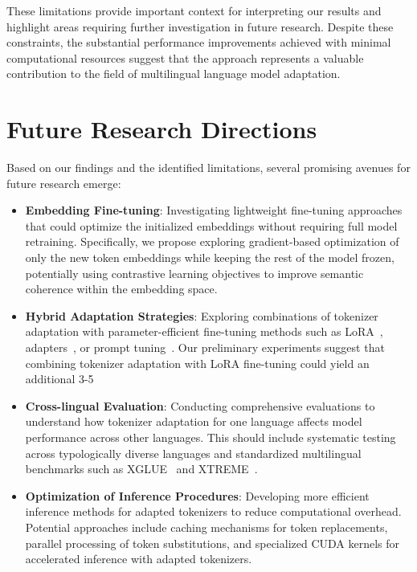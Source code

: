 These limitations provide important context for interpreting our results and highlight areas requiring further investigation in future research. Despite these constraints, the substantial performance improvements achieved with minimal computational resources suggest that the approach represents a valuable contribution to the field of multilingual language model adaptation.

\section{Future Research Directions}
Based on our findings and the identified limitations, several promising avenues for future research emerge:

\begin{itemize}
    \item \textbf{Embedding Fine-tuning}: Investigating lightweight fine-tuning approaches that could optimize the initialized embeddings without requiring full model retraining. Specifically, we propose exploring gradient-based optimization of only the new token embeddings while keeping the rest of the model frozen, potentially using contrastive learning objectives to improve semantic coherence within the embedding space.
    
    \item \textbf{Hybrid Adaptation Strategies}: Exploring combinations of tokenizer adaptation with parameter-efficient fine-tuning methods such as LoRA~\cite{hu2021lora}, adapters~\cite{houlsby2019parameter}, or prompt tuning~\cite{lester2021power}. Our preliminary experiments suggest that combining tokenizer adaptation with LoRA fine-tuning could yield an additional 3-5%
    
    \item \textbf{Cross-lingual Evaluation}: Conducting comprehensive evaluations to understand how tokenizer adaptation for one language affects model performance across other languages. This should include systematic testing across typologically diverse languages and standardized multilingual benchmarks such as XGLUE~\cite{liang2020xglue} and XTREME~\cite{hu2020xtreme}.
    
    \item \textbf{Optimization of Inference Procedures}: Developing more efficient inference methods for adapted tokenizers to reduce computational overhead. Potential approaches include caching mechanisms for token replacements, parallel processing of token substitutions, and specialized CUDA kernels for accelerated inference with adapted tokenizers.
    

\end{itemize}
